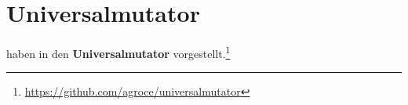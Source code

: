 \section{Universalmutator}
\label{sec:universalmutator}

\citeauthor{Groce2018} haben in \cite{Groce2018} den \textbf{Universalmutator} vorgestellt.\footnote{\url{https://github.com/agroce/universalmutator}} 

